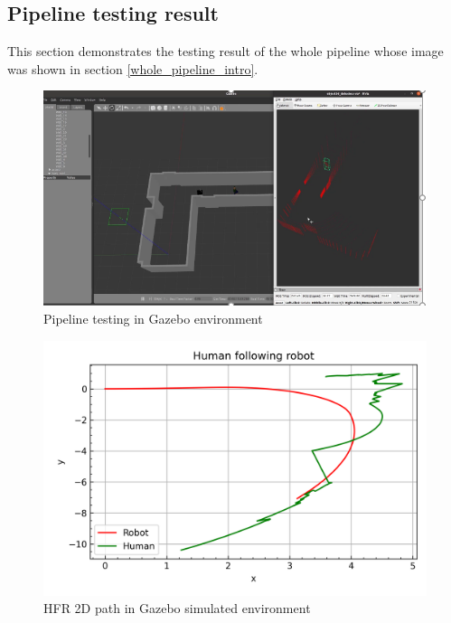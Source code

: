 \clearpage

\subsection{Pipeline testing result}
\label{pipeline_result}

This section demonstrates the testing result of the whole pipeline whose image was shown in section \ref{whole_pipeline_intro}.

\begin{figure}[!htb]
    \centering
    \includegraphics[scale=0.8]{figures/chap4_fig/Results/Gazebo/gazebo_simulation_result.png}
    \caption{Pipeline testing in Gazebo environment}
    \label{Chap4:fig22}
\end{figure}


\begin{figure}[!htb]
    \centering
    \includegraphics[scale=0.8]{figures/chap4_fig/Results/human_following_robot_gazebo_4.png}
    \caption{HFR 2D path in Gazebo simulated environment}
    \label{Chap4:Fig7}
\end{figure}

